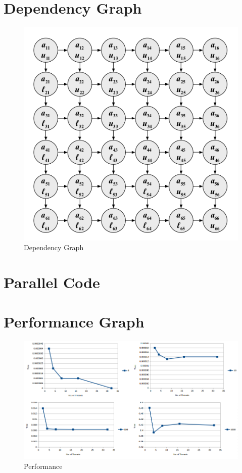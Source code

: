 \documentclass{sem5}
\begin{document}
\section{Dependency Graph}
\begin{figure}[!htp]
\centering
\includegraphics[scale=.4]{pic2.png}
\caption{Dependency Graph}
\end{figure}

\newpage
\section{Parallel Code}


\section{Performance Graph}
\begin{figure}[!htp]
\centering
\includegraphics[scale=.4]{pp.png}
\caption{Performance}
\end{figure}
\end{document}
